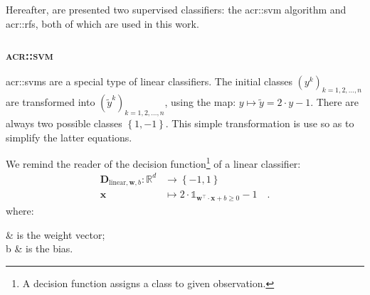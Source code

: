         Hereafter, are presented two supervised classifiers: the \gls{acr::svm} algorithm and \glspl{acr::rf}, both of which are used in this work.

        \subsubsection{\textsc{\acrlong*{acr::svm}}}
            \label{subsubsec::state_of_the_art::mlpr::classifiers::svm}
            \glspl{acr::svm} are a special type of linear classifiers.
            The initial classes $\left(y^k\right)_{k=1, 2, \dots, n}$ are transformed into $\left(\tilde{y}^k\right)_{k=1, 2, \dots, n}$, using the map: $y \mapsto \tilde{y} = 2\cdot y - 1$.
            There are always two possible classes $\left\{1, -1\right\}$.
            This simple transformation is use so as to simplify the latter equations.

            We remind the reader of the decision function\footnote{A decision function assigns a class to given observation.} of a linear classifier:
            \begin{equation}
                \label{eq::linear}
                \begin{aligned}
                    \mathbf{D}_{\text{linear}, \bm{w}, b}: \mathbb{R}^d &\rightarrow \left\{-1, 1\right\}\\
                    \bm{x} &\mapsto 2 \cdot \mathbb{1}_{\bm{w}^\intercal \cdot \bm{x} + b\geq 0} - 1 \quad.
                \end{aligned}
            \end{equation}
            where:
            \begin{conditions}
                 & is the weight vector;\\
                b & is the bias.
            \end{conditions}


